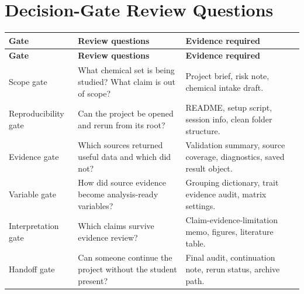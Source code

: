 \section{Decision-Gate Review Questions}
\begin{longtable}{p{}p{}p{}}
\toprule
\textbf{Gate} & \textbf{Review questions} & \textbf{Evidence required}\\
\midrule
\endfirsthead
\toprule
\textbf{Gate} & \textbf{Review questions} & \textbf{Evidence required}\\
\midrule
\endhead
Scope gate & What chemical set is being studied? What claim is out of scope? & Project brief, risk note, chemical intake draft.\\
Reproducibility gate & Can the project be opened and rerun from its root? & README, setup script, session info, clean folder structure.\\
Evidence gate & Which sources returned useful data and which did not? & Validation summary, source coverage, diagnostics, saved result object.\\
Variable gate & How did source evidence become analysis-ready variables? & Grouping dictionary, trait evidence audit, matrix settings.\\
Interpretation gate & Which claims survive evidence review? & Claim-evidence-limitation memo, figures, literature table.\\
Handoff gate & Can someone continue the project without the student present? & Final audit, continuation note, rerun status, archive path.\\
\bottomrule
\end{longtable}

